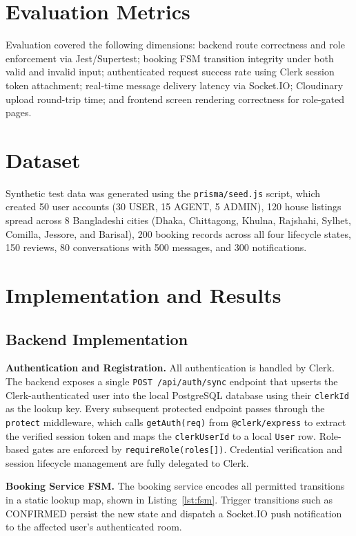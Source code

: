 \documentclass[12pt,a4paper]{report}
\begin{document}
\section{Evaluation Metrics}

Evaluation covered the following dimensions: backend route correctness and role
enforcement via Jest/Supertest; booking FSM transition integrity under both valid and
invalid input; authenticated request success rate using Clerk session token attachment;
real-time message
delivery latency via Socket.IO; Cloudinary upload round-trip time; and frontend screen
rendering correctness for role-gated pages.

\section{Dataset}

Synthetic test data was generated using the \texttt{prisma/seed.js} script, which
created 50 user accounts (30 USER, 15 AGENT, 5 ADMIN), 120 house listings spread
across 8 Bangladeshi cities (Dhaka, Chittagong, Khulna, Rajshahi, Sylhet, Comilla,
Jessore, and Barisal), 200 booking records across all four lifecycle states, 150 reviews,
80 conversations with 500 messages, and 300 notifications.

\section{Implementation and Results}

\subsection{Backend Implementation}

\textbf{Authentication and Registration.}
All authentication is handled by Clerk. The backend exposes a single
\texttt{POST /api/auth/sync} endpoint that upserts the Clerk-authenticated user into the
local PostgreSQL database using their \texttt{clerkId} as the lookup key. Every subsequent
protected endpoint passes through the \texttt{protect} middleware, which calls
\texttt{getAuth(req)} from \texttt{@clerk/express} to extract the verified session token
and maps the \texttt{clerkUserId} to a local \texttt{User} row. Role-based gates are
enforced by \texttt{requireRole(roles[])}. Credential verification and session lifecycle
management are fully delegated to Clerk.

\textbf{Booking Service FSM.}
The booking service encodes all permitted transitions in a static lookup map, shown in
Listing~\ref{lst:fsm}. Trigger transitions such as CONFIRMED persist the new state and
dispatch a Socket.IO push notification to the affected user's authenticated room.
\end{document}
